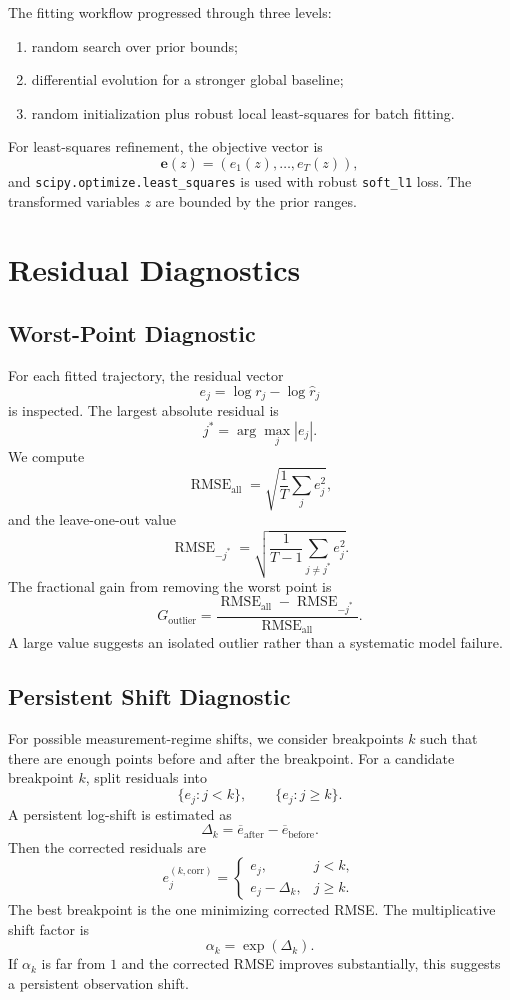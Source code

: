 \documentclass[11pt,a4paper]{article}
\begin{document}
The fitting workflow progressed through three levels:
\begin{enumerate}[leftmargin=2em]
    \item random search over prior bounds;
    \item differential evolution for a stronger global baseline;
    \item random initialization plus robust local least-squares for batch fitting.
\end{enumerate}

For least-squares refinement, the objective vector is
\[
    \mathbf{e}(z) = (e_1(z),\ldots,e_T(z)),
\]
and \texttt{scipy.optimize.least\_squares} is used with robust \texttt{soft\_l1} loss. The transformed variables $z$ are bounded by the prior ranges.

\section{Residual Diagnostics}

\subsection{Worst-Point Diagnostic}

For each fitted trajectory, the residual vector
\[
    e_j = \log r_j - \log \hat{r}_j
\]
is inspected. The largest absolute residual is
\[
    j^* = \arg\max_j |e_j|.
\]
We compute
\[
    \operatorname{RMSE}_{\mathrm{all}}
    = \sqrt{\frac{1}{T}\sum_j e_j^2},
\]
and the leave-one-out value
\[
    \operatorname{RMSE}_{-j^*}
    = \sqrt{\frac{1}{T-1}\sum_{j\neq j^*}e_j^2}.
\]
The fractional gain from removing the worst point is
\[
    G_{\mathrm{outlier}}
    = \frac{\operatorname{RMSE}_{\mathrm{all}}-\operatorname{RMSE}_{-j^*}}
    {\operatorname{RMSE}_{\mathrm{all}}}.
\]
A large value suggests an isolated outlier rather than a systematic model failure.

\subsection{Persistent Shift Diagnostic}

For possible measurement-regime shifts, we consider breakpoints $k$ such that there are enough points before and after the breakpoint. For a candidate breakpoint $k$, split residuals into
\[
    \{e_j:j<k\},
    \qquad
    \{e_j:j\geq k\}.
\]
A persistent log-shift is estimated as
\[
    \Delta_k
    = \overline{e}_{\mathrm{after}} - \overline{e}_{\mathrm{before}}.
\]
Then the corrected residuals are
\[
    e_j^{(k,\mathrm{corr})}
    =
    \begin{cases}
    e_j, & j<k,\\
    e_j - \Delta_k, & j\geq k.
    \end{cases}
\]
The best breakpoint is the one minimizing corrected RMSE. The multiplicative shift factor is
\[
    \alpha_k = \exp(\Delta_k).
\]
If $\alpha_k$ is far from $1$ and the corrected RMSE improves substantially, this suggests a persistent observation shift.
\end{document}
